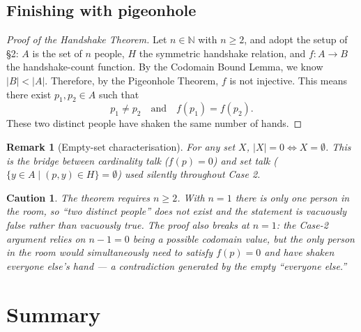 \documentclass[11pt]{article}
\theoremstyle{defstyle}
\theoremstyle{thmstyle}
\theoremstyle{notstyle}
\newtheorem*{remark}{Remark}
\theoremstyle{cautionstyle}
\newtheorem*{caution}{Caution}
\newcommand{\N}{\mathbb{N}}
\begin{document}
\subsection*{Finishing with pigeonhole}

\begin{proof}[Proof of the Handshake Theorem]
Let $n \in \N$ with $n \geq 2$, and adopt the setup of \S2: $A$ is the
set of $n$ people, $H$ the symmetric handshake relation, and
$f \colon A \to B$ the handshake-count function. By the Codomain Bound
Lemma, we know $|B| < |A|$. Therefore, by the Pigeonhole Theorem, $f$
is not injective. This means there exist $p_1, p_2 \in A$ such that
\[
  p_1 \neq p_2 \quad\text{and}\quad f(p_1) = f(p_2).
\]
These two distinct people have shaken the same number of hands. \qedhere
\end{proof}

\begin{notebox}
\begin{remark}[Empty-set characterisation]
For any set $X$, $|X| = 0 \iff X = \emptyset$. This is the bridge
between cardinality talk ($f(p) = 0$) and set talk
($\{y \in A \mid (p,y) \in H\} = \emptyset$) used silently throughout
Case 2.
\end{remark}
\end{notebox}

\begin{cautionbox}
\begin{caution}
The theorem requires $n \geq 2$. With $n = 1$ there is only one person
in the room, so ``two distinct people'' does not exist and the statement
is vacuously false rather than vacuously true. The proof also breaks at
$n = 1$: the Case-2 argument relies on $n - 1 = 0$ being a possible
codomain value, but the only person in the room would simultaneously
need to satisfy $f(p) = 0$ and have shaken everyone else's hand --- a
contradiction generated by the empty ``everyone else.''
\end{caution}
\end{cautionbox}

\section{Summary}
\end{document}
